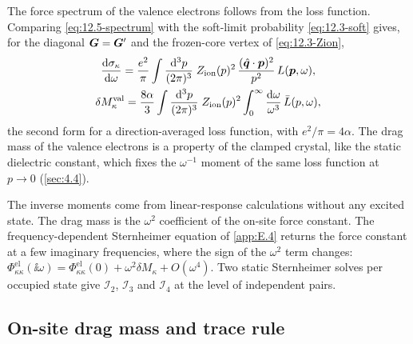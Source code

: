The force spectrum of the valence electrons follows from the loss function. Comparing \cref{eq:12.5-spectrum} with the soft-limit probability \cref{eq:12.3-soft} gives, for the diagonal $\bm{G} = \bm{G}'$ and the frozen-core vertex of \cref{eq:12.3-Zion},
\begin{equation}
  \begin{gathered}
  \frac{\mathrm{d}\sigma_\kappa}{\mathrm{d}\omega} = \frac{e^2}{\pi}\int\frac{\mathrm{d}^3p}{(2\pi)^3}\;Z_{\mathrm{ion}}(p)^2\,\frac{(\hat{\bm{q}}\cdot\bm{p})^2}{p^2}\,L(\bm{p},\omega) , \\
  \delta M^{\mathrm{val}}_\kappa = \frac{8\alpha}{3}\int\frac{\mathrm{d}^3p}{(2\pi)^3}\;Z_{\mathrm{ion}}(p)^2\int_0^\infty\frac{\mathrm{d}\omega}{\omega^3}\,\bar L(p,\omega) ,
  \end{gathered}
  \label{eq:12.5-dMval}
\end{equation}
the second form for a direction-averaged loss function, with $e^2/\pi = 4\alpha$. The drag mass of the valence electrons is a property of the clamped crystal, like the static dielectric constant, which fixes the $\omega^{-1}$ moment of the same loss function at $p \to 0$ (\cref{sec:4.4}).

The inverse moments come from linear-response calculations without any excited state. The drag mass is the $\omega^2$ coefficient of the on-site force constant. The frequency-dependent Sternheimer equation of \cref{app:E.4} returns the force constant at a few imaginary frequencies, where the sign of the $\omega^2$ term changes: $\Phi^{\mathrm{el}}_{\kappa\kappa}(\ii\omega) = \Phi^{\mathrm{el}}_{\kappa\kappa}(0) + \omega^2\delta M_\kappa + O(\omega^4)$. Two static Sternheimer solves per occupied state give $\mathcal{I}_2$, $\mathcal{I}_3$ and $\mathcal{I}_4$ at the level of independent pairs.

\subsection{On-site drag mass and trace rule}\label{sec:12.5-trace}

